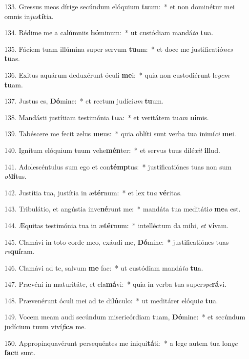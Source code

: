 133. Gressus meos dírige secúndum elóquium \textbf{tu}um:~*  et non dominétur mei omnis in\textit{jus}\textbf{tí}tia.\

134. Rédime me a calúmniis \textbf{hó}minum:~*  ut custódiam mandá\textit{ta} \textbf{tu}a.\

135. Fáciem tuam illúmina super servum \textbf{tu}um:~*  et doce me justificatió\textit{nes} \textbf{tu}as.\

136. Exitus aquárum deduxérunt óculi \textbf{me}i:~*  quia non custodiérunt le\textit{gem} \textbf{tu}am.\

137. Justus es, \textbf{Dó}mine:~*  et rectum judíci\textit{um} \textbf{tu}um.\

138. Mandásti justítiam testimónia \textbf{tu}a:~*  et veritátem tu\textit{am} \textbf{ni}mis.\

139. Tabéscere me fecit zelus \textbf{me}us:~*  quia oblíti sunt verba tua inimí\textit{ci} \textbf{me}i.\

140. Ignítum elóquium tuum vehe\textbf{mén}ter:~*  et servus tuus dilé\textit{xit} \textbf{il}lud.\

141. Adolescéntulus sum ego et con\textbf{témp}tus:~*  justificatiónes tuas non sum \textit{ob}\textbf{lí}tus.\

142. Justítia tua, justítia in æ\textbf{tér}num:~*  et lex tu\textit{a} \textbf{vé}ritas.\

143. Tribulátio, et angústia inve\textbf{né}runt me:~*  mandáta tua meditáti\textit{o} \textbf{me}a est.\

144. Æquitas testimónia tua in æ\textbf{tér}num:~*  intelléctum da mihi, \textit{et} \textbf{vi}vam.\

145. Clamávi in toto corde meo, exáudi me, \textbf{Dó}mine:~*  justificatiónes tuas \textit{re}\textbf{quí}ram.\

146. Clamávi ad te, salvum \textbf{me} fac:~*  ut custódiam mandá\textit{ta} \textbf{tu}a.\

147. Prævéni in maturitáte, et cla\textbf{má}vi:~*  quia in verba tua super\textit{spe}\textbf{rá}vi.\

148. Prævenérunt óculi mei ad te di\textbf{lú}culo:~*  ut meditárer elóqui\textit{a} \textbf{tu}a.\

149. Vocem meam audi secúndum misericórdiam tuam, \textbf{Dó}mine:~*  et secúndum judícium tuum viví\textit{fi}\textbf{ca} me.\

150. Appropinquavérunt persequéntes me iniqui\textbf{tá}ti:~*  a lege autem tua lon\textit{ge} \textbf{fac}ti sunt.\

